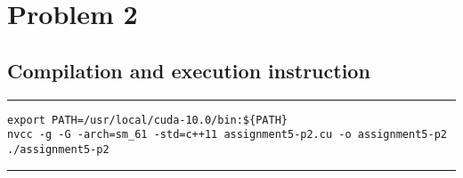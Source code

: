 \documentclass[a4paper]{article}
\begin{document}
\newpage

\section{\Huge Problem 2}
\vspace{0.5cm}
\subsection{Compilation and execution instruction }
\vspace{0.3cm}
\hrule
\begin{lstlisting}
export PATH=/usr/local/cuda-10.0/bin:${PATH}
nvcc -g -G -arch=sm_61 -std=c++11 assignment5-p2.cu -o assignment5-p2
./assignment5-p2
\end{lstlisting}
\hrule 
\vspace{0.5cm}
\end{document}
